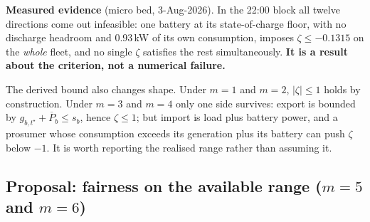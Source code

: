 \documentclass[11pt,a4paper]{article}
\newcommand{\nw}[1]{\textcolor{uaired}{#1}}
\newcommand{\prop}[1]{\textcolor{propblue}{#1}}
\newcommand{\tstar}{t^{\star}}
\begin{document}
\begin{keybox}
\textbf{\nw{Measured evidence}} (micro bed, 3-Aug-2026). In the 22:00 block all twelve directions come
out infeasible: one battery at its state-of-charge floor, with no discharge headroom and 0.93\,kW of
its own consumption, imposes $\zeta\le-0.1315$ on the \emph{whole} fleet, and no single $\zeta$
satisfies the rest simultaneously. \textbf{It is a result about the criterion, not a numerical
failure.}

\nw{The derived bound also changes shape.} Under $m=1$ and $m=2$, $|\zeta|\le1$ holds by construction.
Under $m=3$ and $m=4$ only one side survives: export is bounded by $g_{b,\tstar}+\overline{P}_b\le
s_b$, hence $\zeta\le1$; but import is load plus battery power, and a prosumer whose consumption
exceeds its generation plus its battery can push $\zeta$ below $-1$. It is worth reporting the
realised range rather than assuming it.
\end{keybox}

\subsection{\prop{Proposal: fairness on the available range ($m=5$ and $m=6$)}}
\end{document}
